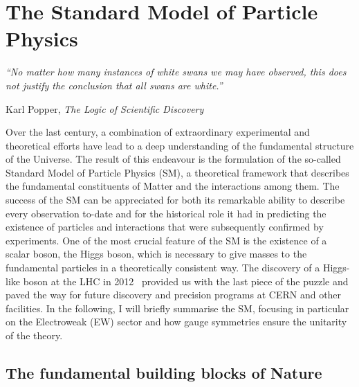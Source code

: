 
%
%
%

\chapter{The Standard Model of Particle Physics}
\label{chap:sm}
\pagestyle{fancy}

\hfill
\begin{minipage}{10cm}

{\small\it 
``No matter how many instances of white swans we may have observed, this does not justify the conclusion that all swans are white.''}

\hfill {\small Karl Popper, \textit{The Logic of Scientific Discovery}}
\end{minipage}

\vspace{0.5cm}

Over the last century, a combination of extraordinary experimental and theoretical efforts have lead to a deep understanding
of the fundamental structure of the Universe. The result of this endeavour is the formulation of the so-called Standard Model 
of Particle Physics (SM), a theoretical framework that describes the fundamental constituents of Matter and the interactions among them.
The success of the SM can be appreciated for both its remarkable ability to describe every observation to-date and for the 
historical role it had in predicting the existence of particles and interactions that were subsequently confirmed by experiments.
One of the most crucial feature of the SM is the existence of a scalar boson, the Higgs boson, which is necessary to give 
masses to the fundamental particles in a theoretically consistent way. The discovery of a Higgs-like boson at the LHC in 2012~\cite{Aad_2012,Chatrchyan_2012}
provided us with the last piece of the puzzle and paved the way for future discovery and precision programs at CERN and other facilities.
In the following, I will briefly summarise the SM, focusing in particular on the Electroweak (EW) sector and how
gauge symmetries ensure the unitarity of the theory.


\section{The fundamental building blocks of Nature}

